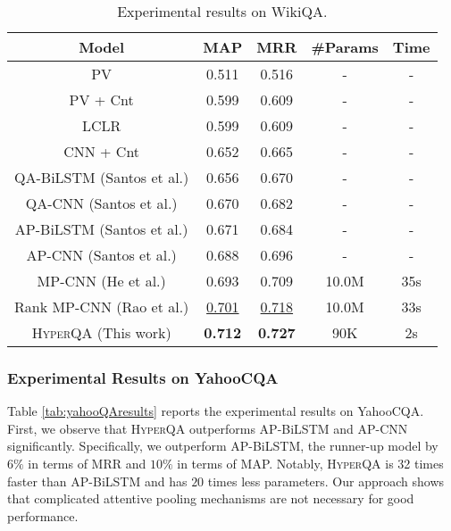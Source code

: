 \documentclass[sigconf]{acmart}
\begin{document}
\begin{table}[ht]
  \centering
\small
    \begin{tabular}{ccccc}
    \hline
       Model   & MAP   & MRR   & \#Params & Time \\
          \hline
    PV  & 0.511 & 0.516 & -     & - \\
    PV + Cnt  & 0.599 & 0.609 & -     & - \\
    LCLR & 0.599 & 0.609 & -     & - \\


    CNN + Cnt & 0.652 & 0.665 & -     & - \\
    QA-BiLSTM  (Santos et al.)& 0.656 & 0.670 & -    & - \\
    QA-CNN  (Santos et al.)& 0.670 & 0.682 & -    & - \\
    AP-BiLSTM  (Santos et al.)& 0.671 & 0.684 & -     & - \\
    AP-CNN (Santos et al.) & 0.688 & 0.696 & -    & - \\
    MP-CNN (He et al.) & 0.693 & 0.709 & 10.0M   & 35s\\
    Rank MP-CNN (Rao et al.) & \underline{0.701} & \underline{0.718} & 10.0M  & 33s \\

   \hline
    \textsc{HyperQA} (This work) & \textbf{0.712} & \textbf{0.727} & 90K   & 2s \\
    \hline
    \end{tabular}

      \caption{Experimental results on WikiQA.}
  \label{tab:wiki_results}\end{table}\subsubsection{Experimental Results on YahooCQA}





Table \ref{tab:yahooQAresults} reports the experimental results on YahooCQA. First, we observe that \textsc{HyperQA} outperforms AP-BiLSTM and AP-CNN significantly. Specifically, we outperform AP-BiLSTM, the runner-up model by $6\%$ in terms of MRR and $10\%$ in terms of MAP. Notably, \textsc{HyperQA} is 32 times faster than AP-BiLSTM and has $20$ times less parameters. Our approach shows that complicated attentive pooling mechanisms are not necessary for good performance. 
\end{document}
